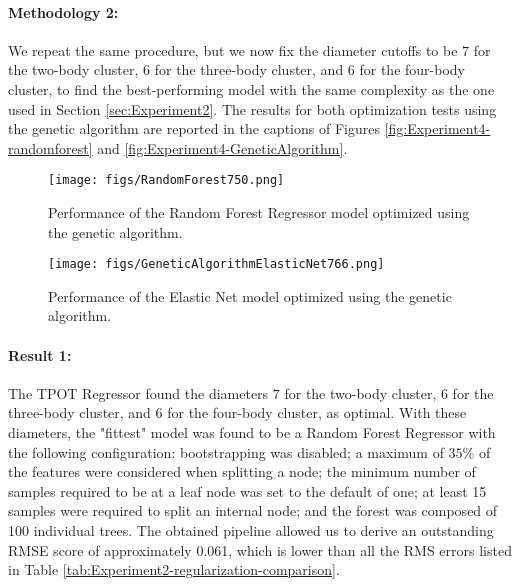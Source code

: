 \documentclass{article}
\begin{document}
\paragraph{Methodology 2:} We repeat the same procedure, but we now fix the diameter cutoffs to be $7$ for the two-body cluster, $6$ for the three-body cluster, and $6$ for the four-body cluster, to find the best-performing model with the same complexity as the one used in Section \ref{sec:Experiment2}. The results for both optimization tests using the genetic algorithm are reported in the captions of Figures \ref{fig:Experiment4-randomforest} and \ref{fig:Experiment4-GeneticAlgorithm}.
\begin{figure}[h!]
    \centering
    \begin{minipage}{0.4\textwidth}
        \centering
        \texttt{[image: figs/RandomForest750.png]}
        \caption{Performance of the Random Forest Regressor model optimized using the genetic algorithm.}
        \label{fig:Experiment4-randomforest}
    \end{minipage}\hfill
    \begin{minipage}{0.4\textwidth}
        \centering
         \texttt{[image: figs/GeneticAlgorithmElasticNet766.png]}
         \caption{Performance of the Elastic Net model optimized using the genetic algorithm.}
        \label{fig:Experiment4-GeneticAlgorithm}
    \end{minipage}
    \hfill
\label{fig:Experiment13D_5CV}
\end{figure}

\paragraph{Result 1:} The TPOT Regressor found the diameters $7$ for the two-body cluster, $6$ for the three-body cluster, and $6$ for the four-body cluster, as optimal. With these diameters, the "fittest" model was found to be a Random Forest Regressor with the following configuration: bootstrapping was disabled; a maximum of $35\%$ of the features were considered when splitting a node; the minimum number of samples required to be at a leaf node was set to the default of one; at least 15 samples were required to split an internal node; and the forest was composed of 100 individual trees. The obtained pipeline allowed us to derive an outstanding RMSE score of approximately 0.061, which is lower than all the RMS errors listed in Table \ref{tab:Experiment2-regularization-comparison}.
\end{document}
